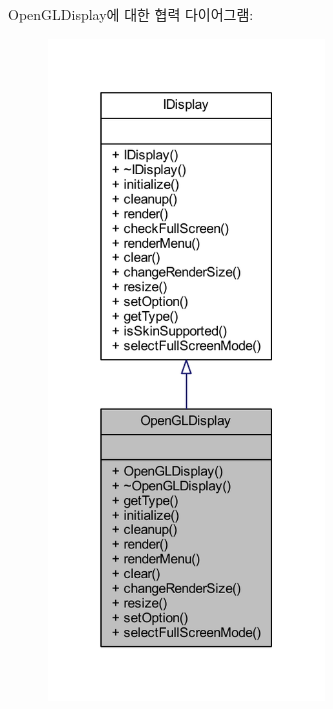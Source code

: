 Open\+G\+L\+Display에 대한 협력 다이어그램\+:\nopagebreak
\begin{figure}[H]
\begin{center}
\leavevmode
\includegraphics[width=208pt]{class_open_g_l_display__coll__graph}
\end{center}
\end{figure}
